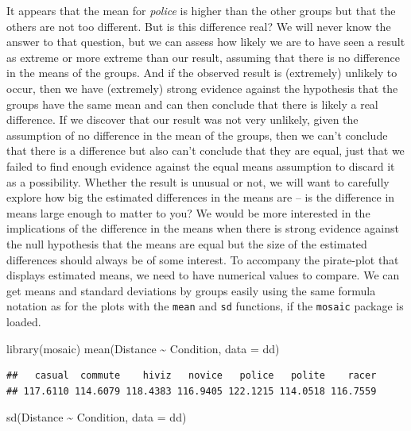\documentclass[
]{book}
\newenvironment{Shaded}{\begin{snugshade}}{\end{snugshade}}
\newcommand{\AttributeTok}[1]{\textcolor[rgb]{0.77,0.63,0.00}{#1}}
\newcommand{\FunctionTok}[1]{\textcolor[rgb]{0.00,0.00,0.00}{#1}}
\newcommand{\NormalTok}[1]{#1}
\newcommand{\SpecialCharTok}[1]{\textcolor[rgb]{0.00,0.00,0.00}{#1}}
\begin{document}
\indent It appears that the mean for \emph{police} is higher than the other groups but that the others are not too different. But is this difference real? We will never
know the answer to that question, but we
can assess how likely we are to have seen a result as extreme or more
extreme than our result, assuming that there is no difference in the
means of the groups. And if the observed result is
(extremely) unlikely to occur, then we have (extremely) strong evidence against the hypothesis that the
groups have the same mean and can then conclude that there is likely a real
difference. If we discover that our result was not very unlikely, given the assumption of no difference in the mean of the groups, then we can't conclude that there is a difference but also can't conclude that they are equal, just that we failed to find enough evidence against the equal means assumption to discard it as a possibility. Whether the result is unusual or not, we will want to carefully explore how big the estimated differences in the means are -- is the difference in means large enough to matter to you? We would be more interested in the implications of the difference in the means when there is strong evidence against the null hypothesis that the means are equal but the size of the estimated differences should always be of some interest. To accompany the pirate-plot that displays estimated means, we
need to have numerical values to compare. We can get means and standard
deviations by groups easily using the same formula notation as for the plots with the \texttt{mean}
and \texttt{sd} functions, if the \texttt{mosaic} package is loaded.

\begin{Shaded}
\begin{Highlighting}[]
\FunctionTok{library}\NormalTok{(mosaic)}
\FunctionTok{mean}\NormalTok{(Distance }\SpecialCharTok{\textasciitilde{}}\NormalTok{ Condition, }\AttributeTok{data =}\NormalTok{ dd)}
\end{Highlighting}
\end{Shaded}

\begin{verbatim}
##   casual  commute    hiviz   novice   police   polite    racer 
## 117.6110 114.6079 118.4383 116.9405 122.1215 114.0518 116.7559
\end{verbatim}

\begin{Shaded}
\begin{Highlighting}[]
\FunctionTok{sd}\NormalTok{(Distance }\SpecialCharTok{\textasciitilde{}}\NormalTok{ Condition, }\AttributeTok{data =}\NormalTok{ dd)}
\end{Highlighting}
\end{Shaded}
\end{document}
